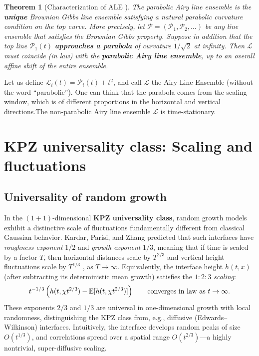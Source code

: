 \documentclass[letterpaper,11pt,oneside,reqno]{article}
\numberwithin{equation}{section}
\newtheorem{theorem}[proposition]{Theorem}
\theoremstyle{definition}
\begin{document}
\begin{theorem}[Characterization of ALE \cite{AggarwalHuang2023Characterization}]
	The parabolic Airy line ensemble is the \textbf{unique}
	Brownian Gibbs line ensemble satisfying a natural
	parabolic curvature condition on the top curve. More
	precisely, let
	$\boldsymbol{\mathcal{P}}=(\mathcal{P}_1,\mathcal{P}_2,\ldots)$
	be any line ensemble that satisfies the Brownian Gibbs
	property. Suppose in addition that the top line
	$\mathcal{P}_1(t)$ \textbf{approaches a parabola} of
	curvature $1/\sqrt{2}$ at infinity. Then
	$\boldsymbol{\mathcal{L}}$ must coincide (in law) with the
	\textbf{parabolic Airy line ensemble}, up to an overall
	affine shift of the entire ensemble.
\end{theorem}

Let us define $\mathcal{L}_i(t)=\mathcal{P}_i(t)+t^2$, and
call $\mathcal{L}$ the Airy Line Ensemble
(without the word ``parabolic''). One can think that the parabola comes
from the scaling window, which is of different proportions
in the horizontal and vertical directions.The non-parabolic
Airy line ensemble $\mathcal{L}$ is time-stationary.

\section{KPZ universality class: Scaling and fluctuations}

\subsection{Universality of random growth}

In the $(1+1)$-dimensional \textbf{KPZ universality class},
random growth models exhibit a distinctive scale of
fluctuations fundamentally different from classical Gaussian
behavior. Kardar, Parisi, and Zhang \cite{KPZ1986} predicted
that such interfaces have \emph{roughness exponent} $1/2$
and \emph{growth exponent} $1/3$, meaning that if time is
scaled by a factor $T$, then horizontal distances scale by
$T^{2/3}$ and vertical height fluctuations scale by
$T^{1/3}$ \cite{remenik2023integrable}, as $T\to\infty$.
Equivalently, the interface height $h(t,x)$ (after subtracting its deterministic mean growth) satisfies the \emph{$1:2:3$ scaling}:
\[ t^{-1/3}\left(
h(t,\chi t^{2/3})-\mathbb{E}[h(t, \chi t^{2/3})]
\right)\qquad \textnormal{converges in law as } t\to\infty.
\]
These exponents $2/3$ and $1/3$ are universal in
one-dimensional growth with local randomness, distinguishing
the KPZ class from, e.g., diffusive (Edwards–Wilkinson)
interfaces. Intuitively, the interface develops random peaks
of size $O(t^{1/3})$, and correlations spread over a spatial
range $O(t^{2/3})$—a highly nontrivial, super-diffusive
scaling.
\end{document}
